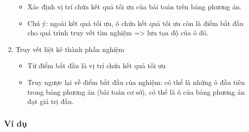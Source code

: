 \begin{enumerate}
\begin{itemize}
            \item Xác định vị trí chứa kết quả tối ưu của bài toán trên bảng phương án.
            \item Chú ý: ngoài kết quả tối ưu, ô chứa kết quả tối ưu còn là điểm bắt đầu cho quá trình truy vết tìm nghiệm => lưu tọa độ của ô đó.
        \end{itemize}
    \item Truy vết liệt kê thành phần nghiệm
        \begin{itemize}
            \item Từ điểm bắt đầu là vị trí chứa kết quả tối ưu
            \item Truy ngược lại về điểm bắt đầu của nghiệm: có thể là những ô đầu tiên trong bảng phương án (bài toán cơ sở), có thể là ô của bảng phương án đạt giá trị đầu.
        \end{itemize}
\end{enumerate}

\subsubsection{Ví dụ}

